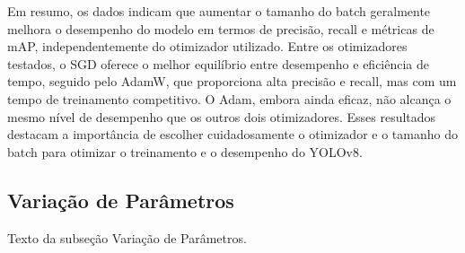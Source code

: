 Em resumo, os dados indicam que aumentar o tamanho do batch geralmente melhora o desempenho do modelo em termos de precisão, recall e métricas de mAP, independentemente do otimizador utilizado. Entre os otimizadores testados, o SGD oferece o melhor equilíbrio entre desempenho e eficiência de tempo, seguido pelo AdamW, que proporciona alta precisão e recall, mas com um tempo de treinamento competitivo. O Adam, embora ainda eficaz, não alcança o mesmo nível de desempenho que os outros dois otimizadores. Esses resultados destacam a importância de escolher cuidadosamente o otimizador e o tamanho do batch para otimizar o treinamento e o desempenho do YOLOv8.

\subsection{Variação de Parâmetros}

Texto da subseção Variação de Parâmetros.






